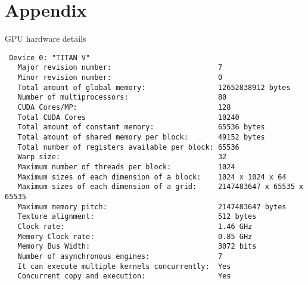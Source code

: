 
\section{Appendix}


\begin{listing}[H]
    \caption{GPU hardware details}%
    \label{lst:gpu_info}
 \begin{verbatim}
 Device 0: "TITAN V"
   Major revision number:                         7
   Minor revision number:                         0
   Total amount of global memory:                 12652838912 bytes
   Number of multiprocessors:                     80
   CUDA Cores/MP:                                 128
   Total CUDA Cores                               10240
   Total amount of constant memory:               65536 bytes
   Total amount of shared memory per block:       49152 bytes
   Total number of registers available per block: 65536
   Warp size:                                     32
   Maximum number of threads per block:           1024
   Maximum sizes of each dimension of a block:    1024 x 1024 x 64
   Maximum sizes of each dimension of a grid:     2147483647 x 65535 x 65535
   Maximum memory pitch:                          2147483647 bytes
   Texture alignment:                             512 bytes
   Clock rate:                                    1.46 GHz
   Memory Clock rate:                             0.85 GHz
   Memory Bus Width:                              3072 bits
   Number of asynchronous engines:                7
   It can execute multiple kernels concurrently:  Yes
   Concurrent copy and execution:                 Yes
 \end{verbatim}
\end{listing}

